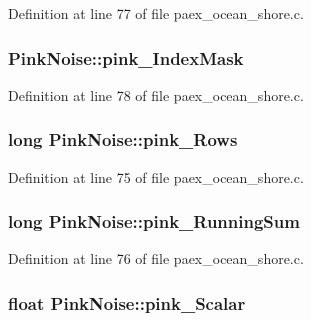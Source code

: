 Definition at line 77 of file paex\+\_\+ocean\+\_\+shore.\+c.

\subsubsection[{\texorpdfstring{pink\+\_\+\+Index\+Mask}{pink_IndexMask}}]{ Pink\+Noise\+::pink\+\_\+\+Index\+Mask}\hypertarget{struct_pink_noise_af8a954114efd034de29ab479d01a397d}{}\label{struct_pink_noise_af8a954114efd034de29ab479d01a397d}


Definition at line 78 of file paex\+\_\+ocean\+\_\+shore.\+c.

\subsubsection[{\texorpdfstring{pink\+\_\+\+Rows}{pink_Rows}}]{\setlength{\rightskip}{0pt plus 5cm}long Pink\+Noise\+::pink\+\_\+\+Rows}\hypertarget{struct_pink_noise_a90f3690a00caf756322dd0b4b2308e50}{}\label{struct_pink_noise_a90f3690a00caf756322dd0b4b2308e50}


Definition at line 75 of file paex\+\_\+ocean\+\_\+shore.\+c.

\subsubsection[{\texorpdfstring{pink\+\_\+\+Running\+Sum}{pink_RunningSum}}]{\setlength{\rightskip}{0pt plus 5cm}long Pink\+Noise\+::pink\+\_\+\+Running\+Sum}\hypertarget{struct_pink_noise_ab098ff066483c79993a84749bcd3a297}{}\label{struct_pink_noise_ab098ff066483c79993a84749bcd3a297}


Definition at line 76 of file paex\+\_\+ocean\+\_\+shore.\+c.

\subsubsection[{\texorpdfstring{pink\+\_\+\+Scalar}{pink_Scalar}}]{\setlength{\rightskip}{0pt plus 5cm}float Pink\+Noise\+::pink\+\_\+\+Scalar}\hypertarget{struct_pink_noise_aacf66ab73ec48c6d7777a7e3a58595ca}{}\label{struct_pink_noise_aacf66ab73ec48c6d7777a7e3a58595ca}


